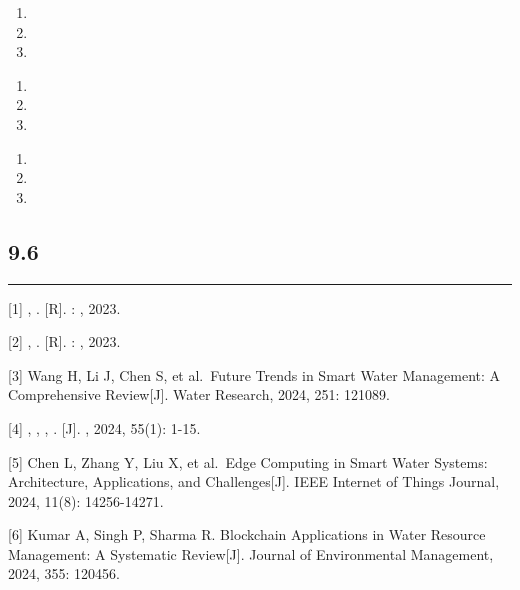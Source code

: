 \important{}

\begin{enumerate}
\def\labelenumi{\arabic{enumi}.}
\item
  \important{}
\item
  \important{}
\item
  \important{}
\end{enumerate}

\important{}

\begin{enumerate}
\def\labelenumi{\arabic{enumi}.}
\item
  \important{}
\item
  \important{}
\item
  \important{}
\end{enumerate}

\important{}

\begin{enumerate}
\def\labelenumi{\arabic{enumi}.}
\item
  \important{}
\item
  \important{}
\item
  \important{}
\end{enumerate}

\hypertarget{section-18}{%
\subsection{9.6}\label{section-18}}

\begin{center}\rule{0.5\linewidth}{0.5pt}\end{center}

\important{}

{[}1{]} , . {[}R{]}. : , 2023.

{[}2{]} , . {[}R{]}. : , 2023.

{[}3{]} Wang H, Li J, Chen S, et al.~Future Trends in Smart Water
Management: A Comprehensive Review{[}J{]}. Water Research, 2024, 251:
121089.

{[}4{]} , , , . {[}J{]}. , 2024, 55(1): 1-15.

{[}5{]} Chen L, Zhang Y, Liu X, et al.~Edge Computing in Smart Water
Systems: Architecture, Applications, and Challenges{[}J{]}. IEEE
Internet of Things Journal, 2024, 11(8): 14256-14271.

{[}6{]} Kumar A, Singh P, Sharma R. Blockchain Applications in Water
Resource Management: A Systematic Review{[}J{]}. Journal of
Environmental Management, 2024, 355: 120456.

